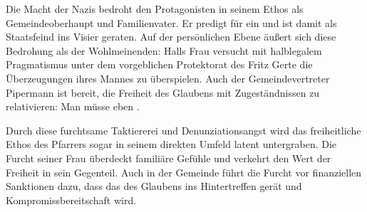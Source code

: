 Die Macht der Nazis bedroht den Protagonisten in seinem Ethos als
Gemeindeoberhaupt und Familienvater. Er predigt für ein  und ist damit als Staatsfeind ins Visier
geraten.  
Auf der persönlichen Ebene äußert sich diese Bedrohung als
 der Wohlmeinenden: Halls Frau versucht mit halblegalem
Pragmatismus unter dem vorgeblichen Protektorat des \Cite{Sturmbannführers}
Fritz Gerte die Überzeugungen
ihres Mannes zu überspielen. Auch der Gemeindevertreter Pipermann ist bereit,
die Freiheit des Glaubens mit Zugeständnissen zu relativieren: Man müsse eben
\Cite{die Lippen versiegeln und das Wort im Herzen behalten}
.

Durch diese furchtsame Taktiererei und Denunziationsangst wird das
freiheitliche Ethos des Pfarrers sogar in seinem direkten Umfeld latent
untergraben. Die Furcht seiner Frau überdeckt familiäre Gefühle  
und verkehrt den Wert der Freiheit in sein
Gegenteil.  
Auch in der Gemeinde führt die Furcht vor finanziellen
Sanktionen  
dazu, dass das \Cite{Fundament}  des Glaubens ins
Hintertreffen gerät und Kompromissbereitschaft
\Cite{systemunterstützend} wird.

